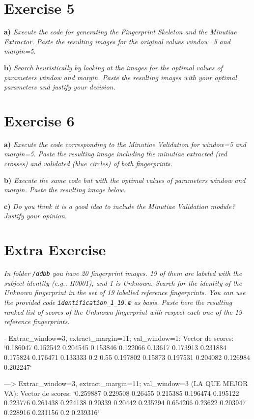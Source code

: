\documentclass[11pt]{article}
\begin{document}
\section{Exercise 5}

\textbf{a) }\emph{Execute the code for generating the Fingerprint Skeleton and the Minutiae Extractor. Paste the resulting images for the original values window=5 and margin=5.}

\textbf{b) }\emph{Search heuristically by looking at the images for the optimal values of parameters window and margin. Paste the resulting images with your optimal parameters and justify your decision.}

\section{Exercise 6}

\textbf{a) }\emph{Execute the code corresponding to the Minutiae Validation for window=5 and margin=5.  Paste the resulting image including the minutiae extracted (red crosses) and validated (blue circles) of both fingerprints. }

\textbf{b) }\emph{Execute the same code but with the optimal values of parameters window and margin. Paste the resulting image below.}

\textbf{c) }\emph{Do you think it is a good idea to include the Minutiae Validation module? Justify your opinion.}

\section{Extra Exercise}

\emph{In folder \texttt{/ddbb} you have 20 fingerprint images. 19 of them are labeled with the subject identity (e.g., H0001), and 1 is Unknown. Search for the identity of the Unknown fingerprint in the set of 19 labelled reference fingerprints. You can use the provided code \texttt{identification\_1\_19.m} as basis. Paste here the resulting ranked list of scores of the Unknown fingerprint with respect each one of the 19 reference fingerprints.}

- Extrac_window=3, extract_margin=11; val_window=1:
Vector de scores:
`0.186047 0.152542 0.204545 0.153846 0.122066 0.13617 0.173913 0.231884 0.175824 0.176471 0.133333 0.2 0.55 0.197802 0.15873 0.197531 0.204082 0.126984 0.202247`

---> Extrac_window=3, extract_margin=11; val_window=3 (LA QUE MEJOR VA):
Vector de scores:
`0.259887 0.229508 0.26455 0.215385 0.196474 0.195122 0.223776 0.261438 0.224138 0.20339 0.20442 0.235294 0.654206 0.23622 0.203947 0.228916 0.231156 0.2 0.239316`
\end{document}
